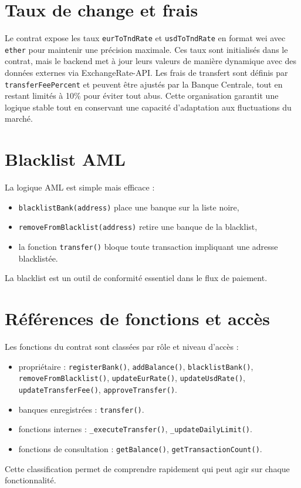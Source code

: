 \documentclass[a4paper,12pt]{report}
\begin{document}
\section{Taux de change et frais}
Le contrat expose les taux \texttt{eurToTndRate} et \texttt{usdToTndRate} en format wei avec \texttt{ether} pour maintenir une précision maximale. Ces taux sont initialisés dans le contrat, mais le backend met à jour leurs valeurs de manière dynamique avec des données externes via ExchangeRate-API. Les frais de transfert sont définis par \texttt{transferFeePercent} et peuvent être ajustés par la Banque Centrale, tout en restant limités à 10\% pour éviter tout abus. Cette organisation garantit une logique stable tout en conservant une capacité d'adaptation aux fluctuations du marché.

\section{Blacklist AML}
La logique AML est simple mais efficace :
\begin{itemize}[leftmargin=*,nosep]
  \item \texttt{blacklistBank(address)} place une banque sur la liste noire,
  \item \texttt{removeFromBlacklist(address)} retire une banque de la blacklist,
  \item la fonction \texttt{transfer()} bloque toute transaction impliquant une adresse blacklistée.
\end{itemize}
La blacklist est un outil de conformité essentiel dans le flux de paiement.

\section{Références de fonctions et accès}
Les fonctions du contrat sont classées par rôle et niveau d'accès :
\begin{itemize}[leftmargin=*,nosep]
  \item propriétaire : \texttt{registerBank()}, \texttt{addBalance()}, \texttt{blacklistBank()}, \texttt{removeFromBlacklist()}, \texttt{updateEurRate()}, \texttt{updateUsdRate()}, \texttt{updateTransferFee()}, \texttt{approveTransfer()}.
  \item banques enregistrées : \texttt{transfer()}.
  \item fonctions internes : \texttt{\_executeTransfer()}, \texttt{\_updateDailyLimit()}.
  \item fonctions de consultation : \texttt{getBalance()}, \texttt{getTransactionCount()}.
\end{itemize}
Cette classification permet de comprendre rapidement qui peut agir sur chaque fonctionnalité.
\end{document}
